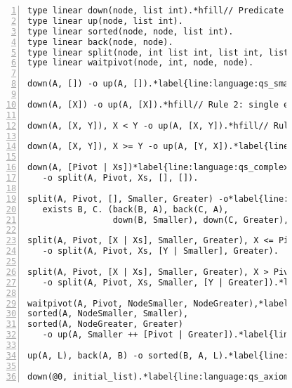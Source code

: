 \begin{figure}[h!]
\begin{Verbatim}[numbers=left,fontsize=\codesize,commandchars=\*\{\}]
type linear down(node, list int).*hfill// Predicate declaration
type linear up(node, list int).
type linear sorted(node, node, list int).
type linear back(node, node).
type linear split(node, int list int, list int, list int).
type linear waitpivot(node, int, node, node).

down(A, []) -o up(A, []).*label{line:language:qs_small1}*hfill// Rule 1: empty list

down(A, [X]) -o up(A, [X]).*hfill// Rule 2: single element list

down(A, [X, Y]), X < Y -o up(A, [X, Y]).*hfill// Rule 3: two element list

down(A, [X, Y]), X >= Y -o up(A, [Y, X]).*label{line:language:qs_small2}*hfill// Rule 4: two element list

down(A, [Pivot | Xs])*label{line:language:qs_complex}*hfill// Rule 5: lists with more than two elements
   -o split(A, Pivot, Xs, [], []).

split(A, Pivot, [], Smaller, Greater) -o*label{line:language:qs_exists1}*hfill// Rule 6: create nodes to sort sublists
   exists B, C. (back(B, A), back(C, A),
                 down(B, Smaller), down(C, Greater), waitpivot(A, Pivot, B, C)).*label{line:language:qs_exists2}

split(A, Pivot, [X | Xs], Smaller, Greater), X <= Pivot*label{line:language:qs_split1}*hfill// Rule 7: split case 1
   -o split(A, Pivot, Xs, [Y | Smaller], Greater).

split(A, Pivot, [X | Xs], Smaller, Greater), X > Pivot*hfill// Rule 8: split case 2
   -o split(A, Pivot, Xs, Smaller, [Y | Greater]).*label{line:language:qs_split2}
   
waitpivot(A, Pivot, NodeSmaller, NodeGreater),*label{line:language:qs_sorted1}*hfill// Rule 9: merge sublists
sorted(A, NodeSmaller, Smaller),
sorted(A, NodeGreater, Greater)
   -o up(A, Smaller ++ [Pivot | Greater]).*label{line:language:qs_sorted2}*label{line:language:qs_up}

up(A, L), back(A, B) -o sorted(B, A, L).*label{line:language:qs_back}*hfill// Rule 10: send list to parent

down(@0, initial_list).*label{line:language:qs_axiom}*hfill// Initial facts
\end{Verbatim}
  \label{language:code:quicksort}
\end{figure}

